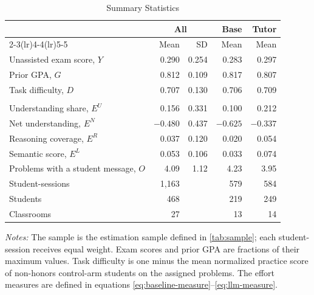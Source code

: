 \begin{table}[htbp]
\centering
\begingroup
{}
\small
\setlength{\tabcolsep}{5pt}
\caption{Summary Statistics}
\label{tab:summary}
\begin{tabular}{lrrrr}
\toprule
 & \multicolumn{2}{c}{All} & Base & Tutor \\
\cmidrule(lr){2-3}\cmidrule(lr){4-4}\cmidrule(lr){5-5}
 & Mean & SD & Mean & Mean \\
\midrule
Unassisted exam score, $Y$ & 0.290 & 0.254 & 0.283 & 0.297 \\
Prior GPA, $G$ & 0.812 & 0.109 & 0.817 & 0.807 \\
Task difficulty, $D$ & 0.707 & 0.130 & 0.706 & 0.709 \\
\addlinespace
\multicolumn{5}{l}{\textit{Effort measures}} \\
\quad Understanding share, $E^{U}$ & 0.156 & 0.331 & 0.100 & 0.212 \\
\quad Net understanding, $E^{N}$ & $-0.480$ & 0.437 & $-0.625$ & $-0.337$ \\
\quad Reasoning coverage, $E^{R}$ & 0.037 & 0.120 & 0.020 & 0.054 \\
\quad Semantic score, $E^{L}$ & 0.053 & 0.106 & 0.033 & 0.074 \\
\addlinespace
Problems with a student message, $O$ & 4.09 & 1.12 & 4.23 & 3.95 \\
\midrule
Student-sessions & 1,163 &  & 579 & 584 \\
Students & 468 &  & 219 & 249 \\
Classrooms & 27 &  & 13 & 14 \\
\bottomrule
\end{tabular}
\par\medskip
\begin{minipage}{\linewidth}
\footnotesize
\textit{Notes:} The sample is the estimation sample defined in \autoref{tab:sample}; each student-session receives equal weight. Exam scores and prior GPA are fractions of their maximum values. Task difficulty is one minus the mean normalized practice score of non-honors control-arm students on the assigned problems. The effort measures are defined in equations \eqref{eq:baseline-measure}--\eqref{eq:llm-measure}.
\end{minipage}
\endgroup
\end{table}

